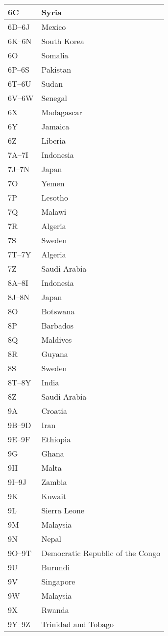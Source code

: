 \begin{longtable}{|l|l|}
	\hline
	6C & Syria \\
	\hline
	6D--6J & Mexico \\
	\hline
	6K--6N & South Korea \\
	\hline
	6O & Somalia \\
	\hline
	6P--6S & Pakistan \\
	\hline
	6T--6U & Sudan \\
	\hline
	6V--6W & Senegal \\
	\hline
	6X & Madagascar \\
	\hline
	6Y & Jamaica \\
	\hline
	6Z & Liberia \\
	\hline
	7A--7I & Indonesia \\
	\hline
	7J--7N & Japan \\
	\hline
	7O & Yemen \\
	\hline
	7P & Lesotho \\
	\hline
	7Q & Malawi \\
	\hline
	7R & Algeria \\
	\hline
	7S & Sweden \\
	\hline
	7T--7Y & Algeria \\
	\hline
	7Z & Saudi Arabia \\
	\hline
	8A--8I & Indonesia \\
	\hline
	8J--8N & Japan \\
	\hline
	8O & Botswana \\
	\hline
	8P & Barbados \\
	\hline
	8Q & Maldives \\
	\hline
	8R & Guyana \\
	\hline
	8S & Sweden \\
	\hline
	8T--8Y & India \\
	\hline
	8Z & Saudi Arabia \\
	\hline
	9A & Croatia \\
	\hline
	9B--9D & Iran \\
	\hline
	9E--9F & Ethiopia \\
	\hline
	9G & Ghana \\
	\hline
	9H & Malta \\
	\hline
	9I--9J & Zambia \\
	\hline
	9K & Kuwait \\
	\hline
	9L & Sierra Leone \\
	\hline
	9M & Malaysia \\
	\hline
	9N & Nepal \\
	\hline
	9O--9T & Democratic Republic of the Congo \\
	\hline
	9U & Burundi \\
	\hline
	9V & Singapore \\
	\hline
	9W & Malaysia \\
	\hline
	9X & Rwanda \\
	\hline
	9Y--9Z & Trinidad and Tobago \\
	\hline
\end{longtable}

